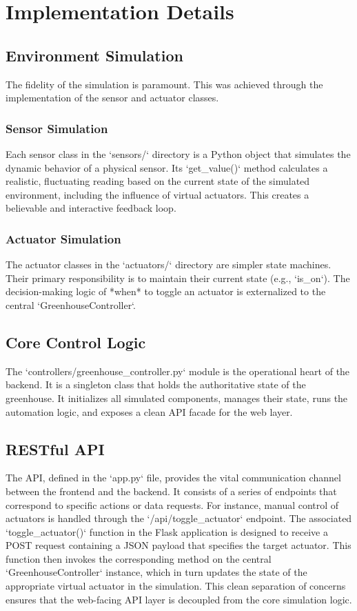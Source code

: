 \documentclass[12pt, a4paper]{report}
\begin{document}
\chapter{Implementation Details}

\section{Environment Simulation}
The fidelity of the simulation is paramount. This was achieved through the implementation of the sensor and actuator classes.

\subsection{Sensor Simulation}
Each sensor class in the `sensors/` directory is a Python object that simulates the dynamic behavior of a physical sensor. Its `get_value()` method calculates a realistic, fluctuating reading based on the current state of the simulated environment, including the influence of virtual actuators. This creates a believable and interactive feedback loop.

\subsection{Actuator Simulation}
The actuator classes in the `actuators/` directory are simpler state machines. Their primary responsibility is to maintain their current state (e.g., `is_on`). The decision-making logic of *when* to toggle an actuator is externalized to the central `GreenhouseController`.

\section{Core Control Logic}
The `controllers/greenhouse_controller.py` module is the operational heart of the backend. It is a singleton class that holds the authoritative state of the greenhouse. It initializes all simulated components, manages their state, runs the automation logic, and exposes a clean API facade for the web layer.

\section{RESTful API}
The API, defined in the `app.py` file, provides the vital communication channel between the frontend and the backend. It consists of a series of endpoints that correspond to specific actions or data requests. For instance, manual control of actuators is handled through the `/api/toggle_actuator` endpoint. The associated `toggle_actuator()` function in the Flask application is designed to receive a POST request containing a JSON payload that specifies the target actuator. This function then invokes the corresponding method on the central `GreenhouseController` instance, which in turn updates the state of the appropriate virtual actuator in the simulation. This clean separation of concerns ensures that the web-facing API layer is decoupled from the core simulation logic.
\end{document}
